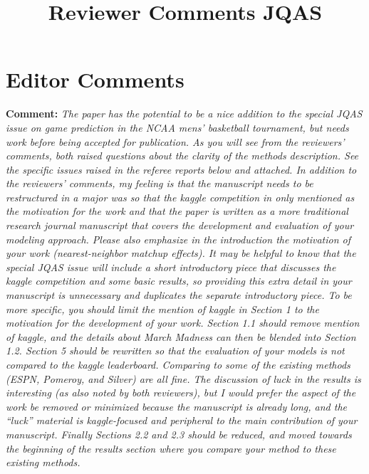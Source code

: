 \documentclass[11pt]{article} %
\title{Reviewer Comments JQAS}
\begin{document}
\maketitle


\section*{Editor Comments}
{\bf Comment: } \emph{The paper has the potential to be a nice addition to the special JQAS issue on game prediction in the NCAA mens' basketball tournament, but needs work before being accepted for publication. As you will see from the reviewers' comments, both raised questions about the clarity of the methods description. See the specific issues raised in the referee reports below and attached. In addition to the reviewers' comments, my feeling is that the manuscript needs to be restructured in a major was so that the kaggle competition in only mentioned as the motivation for the work and that the paper is written as a more traditional research journal manuscript that covers the development and evaluation of your modeling approach. Please also emphasize in the introduction the motivation of your work (nearest-neighbor matchup effects). It may be helpful to know that the special JQAS issue will include a short introductory piece that discusses the kaggle competition and some basic results, so providing this extra detail in your manuscript is unnecessary and duplicates the separate introductory piece. To be more specific, you should limit the mention of kaggle in Section 1 to the motivation for the development of your work. Section 1.1 should remove mention of kaggle, and the details about March Madness can then be blended into Section 1.2. Section 5 should be rewritten so that the evaluation of your models is not compared to the kaggle leaderboard. Comparing to some of the existing methods (ESPN, Pomeroy, and Silver) are all fine. The discussion of luck in the results is interesting (as also noted by both reviewers), but I would prefer the aspect of the work be removed or minimized because the manuscript is already long, and the ``luck'' material is kaggle-focused and peripheral to the main contribution of your manuscript. Finally Sections 2.2 and 2.3 should be reduced, and moved towards the beginning of the results section where you compare your method to these existing methods.}\\
\end{document}
